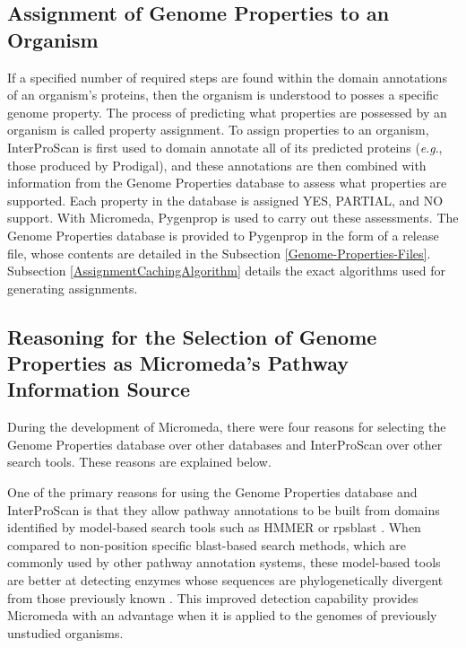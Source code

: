 \subsection{Assignment of Genome Properties to an Organism}

If a specified number of required steps are found within the domain annotations 
of an organism's proteins, then the organism is understood to posses a specific 
genome property. The process of predicting what properties are possessed by an 
organism is called property assignment. To assign properties to an organism, 
InterProScan is first used to domain annotate all of its predicted proteins 
(\textit{e}.\textit{g}., those produced by Prodigal), and these annotations are then combined with 
information from the Genome Properties database to assess what properties are 
supported. Each property in the database is assigned YES, PARTIAL, and NO 
support. With Micromeda, Pygenprop is used to carry out these assessments. The 
Genome Properties database is provided to Pygenprop in the form of a release 
file, whose contents are detailed in the Subsection \ref{Genome-Properties-Files}. 
Subsection \ref{AssignmentCachingAlgorithm} details the exact algorithms used
for generating assignments.  

\subsection{Reasoning for the Selection of Genome Properties as Micromeda's 
Pathway Information Source} \label{reason-for-genome-properties-selection}

During the development of Micromeda, there were four reasons for selecting the 
Genome Properties database over other databases and InterProScan over other 
search tools. These reasons are explained below.

One of the primary reasons for using the Genome Properties database and 
InterProScan is that they allow pathway annotations to be built from domains 
identified by model-based search tools such as HMMER \cite{eddy2011accelerated} 
or \gls{rpsblast} \cite{mcginnis2004blast}. When compared to non-position
specific \gls{blast}-based \cite{altschul1990basic} search methods, which are 
commonly used by other pathway annotation systems, these model-based tools are 
better at detecting enzymes whose sequences are phylogenetically divergent from 
those previously known \cite{eddy2011accelerated}. This improved detection 
capability provides Micromeda with an advantage when it is applied to the 
genomes of previously unstudied organisms.

